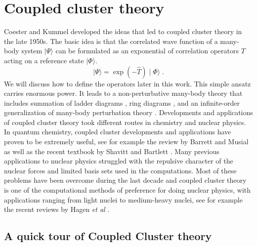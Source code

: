 \section{Coupled cluster theory}\label{sec:cctheory}
  
Coester and Kummel developed the ideas that led to coupled cluster
theory in the late 1950s. The basic idea is that the correlated wave function
of a many-body system $\mid\Psi\rangle$
can be formulated as an exponential of correlation
operators $T$ acting on a reference state $\mid\Phi\rangle$.
\begin{equation}
\mid\Psi\rangle = \exp\left(-\hat{T}\right)\mid\Phi\rangle\;.
\end{equation}
We will discuss how to define the operators later in this work. This simple
ansatz carries enormous power. It leads to a non-perturbative many-body
theory that includes summation of ladder diagrams \cite{brueckner1955}, ring
diagrams \cite{GB1957}, and an infinite-order
generalization of many-body perturbation theory
\cite{Bart_silver74, Bart_silver76}.
Developments and applications of coupled cluster theory took
different routes in chemistry and nuclear physics. In quantum
chemistry, coupled cluster developments and applications have proven
to be extremely useful, see for example the review by Barrett and
Musial as well as the recent textbook by Shavitt and Bartlett \cite{shavittbartlett2009}.
Many previous applications to nuclear physics struggled with the
repulsive character of the nuclear forces and limited basis sets
used in the computations. Most of these problems have been overcome
during the last decade and coupled cluster theory is one of the
computational methods of preference for doing nuclear physics, with
  applications ranging from light nuclei to medium-heavy nuclei, see
  for example the recent reviews by Hagen {\em et al} \cite{papenbrock2014,hagen2016}.


\subsection{A quick tour of Coupled Cluster theory}

